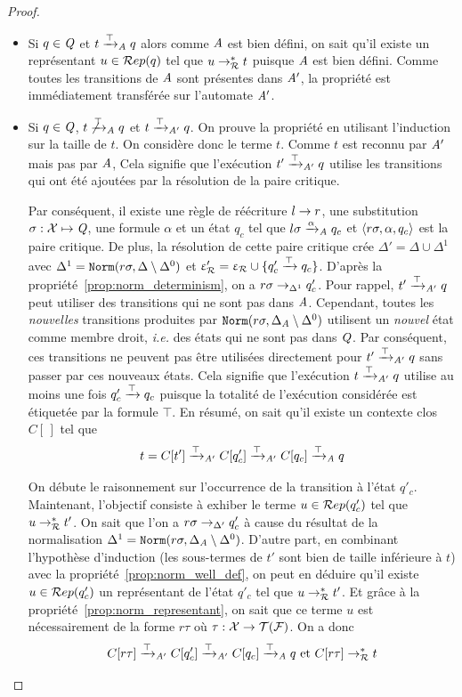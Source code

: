 \begin{proof}
\begin{enumerate}
  \begin{itemize}
  \item Si $q\in\mathit Q$ et $t\xrightarrow{\top}_\mathit A q$ alors comme $\mathit A$ est bien défini, on sait qu'il 
    existe un représentant $u\in \mathcal R ep(q)$ tel que $u\rightarrow_\mathcal R^* t$ puisque $\mathit A$ est bien défini.
    Comme toutes les transitions de $\mathit A$ sont présentes dans $\mathit A'$, la propriété est immédiatement transférée
    sur l'automate $\mathit A'$.

  \item Si $q\in\mathit Q$, $t \not\xrightarrow{\top}_\mathit A q$ et $t \xrightarrow{\top}_{\mathit A'} q$. On prouve la propriété en utilisant l'induction
    sur la taille de $t$. On considère donc le terme $t$. Comme $t$ est reconnu
    par $\mathit A'$ mais pas par $\mathit A$, Cela signifie que l'exécution $t' \xrightarrow{\top}_{\mathit A'} q$ utilise
    les transitions qui ont été ajoutées par la résolution de la paire critique.
    
    Par conséquent, il existe une règle de réécriture $l \rightarrow r$, une substitution $\sigma:\mathcal X \mapsto \mathit Q$,
    une formule $\alpha$ et un état  $q_c$ tel que $l\sigma \xrightarrow{\alpha}_\mathit A q_c$ et $\langle
    r\sigma, \alpha, q_c\rangle$ est la paire critique. De plus, la résolution de cette paire
    critique crée $\Delta'= \Delta \cup \Delta^1$ avec $\Delta^1 = \mathtt{Norm}(r\sigma,\Delta \setminus \Delta^0)$
    et $\upvarepsilon_{\mathcal R}'=\upvarepsilon_{\mathcal R} \cup \{q'_c \xrightarrow{\top} q_c\}$.
    D'après la propriété~\ref{prop:norm_determinism}, on a $r\sigma \rightarrow_{\Delta^1} q'_c$.
    Pour rappel, $t' \xrightarrow{\top}_{\mathit A'} q$ peut utiliser des transitions qui ne sont pas dans $\mathit A$. 
    Cependant, toutes les {\em nouvelles} transitions produites par
    $\mathtt{Norm}(r\sigma,\Delta_\mathit A\setminus \Delta^0)$ utilisent un {\em nouvel} état comme membre droit,
    \textit{i.e.} des états qui ne sont pas dans $\mathit Q$. Par conséquent, ces transitions
    ne peuvent pas être utilisées directement pour $t' \xrightarrow{\top}_{\mathit A'} q$ sans passer par ces nouveaux états. Cela signifie
    que l'exécution  $t \xrightarrow{\top}_{\mathit A'} q$ utilise au moins une fois $q'_c \xrightarrow{\top} q_c$
    puisque la totalité de l'exécution considérée est étiquetée par la formule $\top$. 
    En résumé, on sait qu'il existe un contexte clos $C[\,]$ tel que
    \[t=C[t'] \xrightarrow{\top}_{\mathit A'} C[q'_c] \xrightarrow{\top}_{\mathit A'} C[q_c] \xrightarrow{\top}_\mathit A q\]

    On débute le raisonnement sur l'occurrence de la transition à l'état $q'_c$. 
    Maintenant, l'objectif consiste à exhiber le terme $u\in \mathcal R ep(q_c')$ tel que $u \rightarrow_\mathcal R^* t'$. 
    On sait que l'on a $r\sigma \rightarrow_{\Delta'} q'_c$ à cause du résultat de la normalisation $\Delta^1= \mathtt{Norm}(r\sigma,\Delta_\mathit A\setminus \Delta^0)$.
    D'autre part, en combinant l'hypothèse d'induction (les sous-termes de $t'$ sont bien de taille inférieure à $t$) avec la propriété~\ref{prop:norm_well_def},
    on peut en déduire qu'il existe $u \in \mathcal R ep(q_c')$ un représentant de l'état $q'_c$ tel que $u \rightarrow_\mathcal R^* t'$.
    Et grâce à la propriété~\ref{prop:norm_representant}, on sait que ce terme $u$ est nécessairement de la forme $r\tau$ où $\tau : \mathcal X \rightarrow \mathcal{T(F)}$.
    On a donc
    \[ C[r\tau] \xrightarrow{\top}_{\mathit A'} C[q'_c] \xrightarrow{\top}_{\mathit A'} C[q_c] \xrightarrow{\top}_\mathit A q \textrm{ et } C[r\tau] \rightarrow_\mathcal R^* t \]
    

\end{itemize}
\end{enumerate}
\end{proof}
